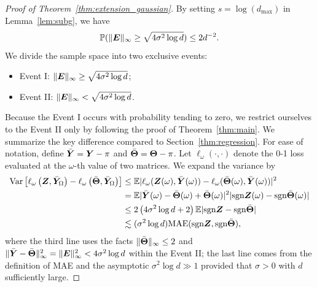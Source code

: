 \documentclass[11pt]{article}
\theoremstyle{plain}
\theoremstyle{definition}
\def\sign{\textup{sgn}}
\begin{document}
\begin{proof}[Proof of Theorem~\ref{thm:extension_gaussian}]
By setting $s=\log(d_{\max})$ in Lemma~\ref{lem:subg}, we have
\[
\mathbb{P}(\lVert\bm{E}\rVert_\infty\geq \sqrt{4\sigma^2\log d} )\leq 2d^{-2}.
\]
We divide the sample space into two exclusive events:
\begin{itemize}
\item Event I: $\lVert\bm{E}\rVert_\infty\geq \sqrt{4\sigma^2\log d}$;
\item Event II: $\lVert\bm{E}\rVert_\infty< \sqrt{4\sigma^2\log d}$.
\end{itemize}
Because the Event I occurs with probability tending to zero, we restrict ourselves to the Event II only by following the proof of Theorem~\ref{thm:main}. We summarize the key difference compared to Section~\ref{thm:regression}. For ease of notation,  define $\bar {\bm Y} = \bm Y-\pi$ and $\bar{\bm{\Theta}} = \bm{\Theta}-\pi$. Let $\ell_\omega(\cdot, \cdot)$ denote the 0-1 loss evaluated at the $\omega$-th value of two matrices. We expand the variance by 
\begin{align}
    \label{eq:variance2}
    \text{Var}\left[\ell_\omega\left(\mZ,\bar \mY_\Omega\right)-\ell_\omega\left(\bar\mTheta,\bar\mY_\Omega\right)\right]&\leq \mathbb{E}|\ell_\omega(\mZ(\omega),\bar\mY(\omega))-\ell_\omega(\bar\mTheta(\omega),\bar\mY(\omega))|^2\notag \\
    &= \mathbb{E}|\bar \mY(\omega)-\bar \mTheta(\omega)+\bar\mTheta(\omega)|^2|\text{sgn}\mZ(\omega)-\text{sgn}\bar\mTheta(\omega)| \notag \\
    &\leq 2\left(4 \sigma^2\log d+2\right) \mathbb{E}|\text{sgn}\mZ-\text{sgn}\bar\mTheta| \notag \\
    & \lesssim (\sigma^2 \log d) \text{MAE}(\sign \mZ, \sign \bar \mTheta),
    \end{align}
where the third line uses the facts $\lVert\bar {\bm{\Theta}}\rVert_\infty\leq 2$ and $\lVert\bar {\bm Y}-\bar {\bm{\Theta}}\rVert_\infty^2=\lVert\bm{E}\rVert_\infty^2<4 \sigma^2\log d$ within the Event II; the last line comes from the definition of MAE and the asymptotic $\sigma^2\log d\gg 1$ provided that $\sigma>0$ with $d$ sufficiently large. 


\end{proof}
\end{document}

